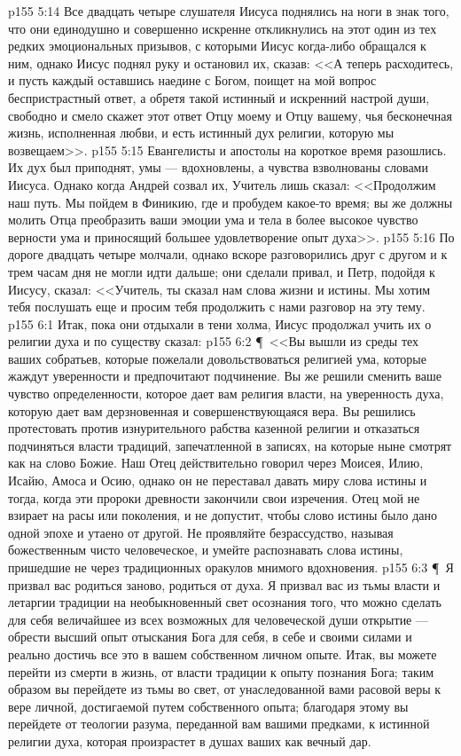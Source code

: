 \vs p155 5:14 Все двадцать четыре слушателя Иисуса поднялись на ноги в знак того, что они единодушно и совершенно искренне откликнулись на этот один из тех редких эмоциональных призывов, с которыми Иисус когда\hyp{}либо обращался к ним, однако Иисус поднял руку и остановил их, сказав: <<А теперь расходитесь, и пусть каждый оставшись наедине с Богом, поищет на мой вопрос беспристрастный ответ, а обретя такой истинный и искренний настрой души, свободно и смело скажет этот ответ Отцу моему и Отцу вашему, чья бесконечная жизнь, исполненная любви, и есть истинный дух религии, которую мы возвещаем>>.
\vs p155 5:15 Евангелисты и апостолы на короткое время разошлись. Их дух был приподнят, умы --- вдохновлены, а чувства взволнованы словами Иисуса. Однако когда Андрей созвал их, Учитель лишь сказал: <<Продолжим наш путь. Мы пойдем в Финикию, где и пробудем какое\hyp{}то время; вы же должны молить Отца преобразить ваши эмоции ума и тела в более высокое чувство верности ума и приносящий большее удовлетворение опыт духа>>.
\vs p155 5:16 По дороге двадцать четыре молчали, однако вскоре разговорились друг с другом и к трем часам дня не могли идти дальше; они сделали привал, и Петр, подойдя к Иисусу, сказал: <<Учитель, ты сказал нам слова жизни и истины. Мы хотим тебя послушать еще и просим тебя продолжить с нами разговор на эту тему.
\vs p155 6:1 Итак, пока они отдыхали в тени холма, Иисус продолжал учить их о религии духа и по существу сказал:
\vs p155 6:2 \P\ <<Вы вышли из среды тех ваших собратьев, которые пожелали довольствоваться религией ума, которые жаждут уверенности и предпочитают подчинение. Вы же решили сменить ваше чувство определенности, которое дает вам религия власти, на уверенность духа, которую дает вам дерзновенная и совершенствующаяся вера. Вы решились протестовать против изнурительного рабства казенной религии и отказаться подчиняться власти традиций, запечатленной в записях, на которые ныне смотрят как на слово Божие. Наш Отец действительно говорил через Моисея, Илию, Исайю, Амоса и Осию, однако он не переставал давать миру слова истины и тогда, когда эти пророки древности закончили свои изречения. Отец мой не взирает на расы или поколения, и не допустит, чтобы слово истины было дано одной эпохе и утаено от другой. Не проявляйте безрассудство, называя божественным чисто человеческое, и умейте распознавать слова истины, пришедшие не через традиционных оракулов мнимого вдохновения.
\vs p155 6:3 \P\ Я призвал вас родиться заново, родиться от духа. Я призвал вас из тьмы власти и летаргии традиции на необыкновенный свет осознания того, что можно сделать для себя величайшее из всех возможных для человеческой души открытие --- обрести высший опыт отыскания Бога для себя, в себе и своими силами и реально достичь все это в вашем собственном личном опыте. Итак, вы можете перейти из смерти в жизнь, от власти традиции к опыту познания Бога; таким образом вы перейдете из тьмы во свет, от унаследованной вами расовой веры к вере личной, достигаемой путем собственного опыта; благодаря этому вы перейдете от теологии разума, переданной вам вашими предками, к истинной религии духа, которая произрастет в душах ваших как вечный дар.
